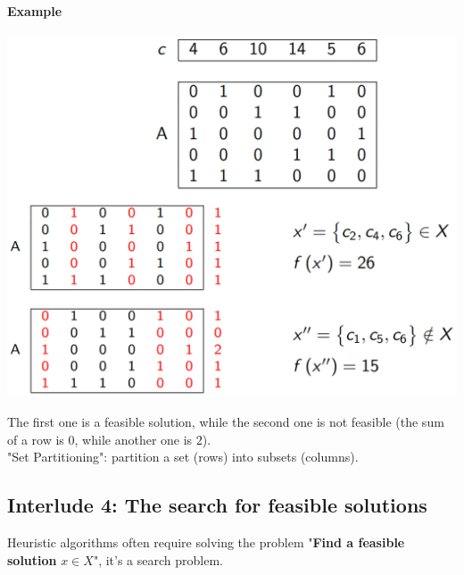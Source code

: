 \paragraph{Example}
\begin{center}
	\includegraphics[width=\columnwidth]{img/SPP1}
\end{center}
The first one is a feasible solution, while the second one is not feasible (the sum of a row is $0$, while another one is $2$).\\

"Set Partitioning": partition a set (rows) into subsets (columns).\\

\newpage

\subsection*{Interlude 4: The search for feasible solutions}
Heuristic algorithms often require solving the problem "\textbf{Find a feasible solution} $x \in X$", it's a search problem. \\

